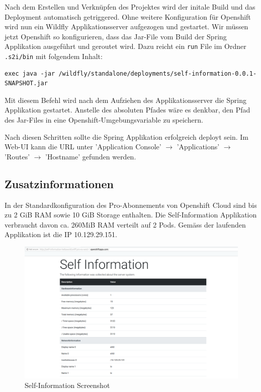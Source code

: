 \documentclass[12pt,a4paper]{article}
\begin{document}
Nach dem Erstellen und Verknüpfen des Projektes wird der initale Build und das Deployment automatisch getriggered. Ohne weitere Konfiguration für Openshift wird nun ein Wildfly Applikationsserver aufgezogen und gestartet. Wir müssen jetzt Openshift so konfigurieren, dass das Jar-File vom Build der Spring Applikation ausgeführt und geroutet wird. Dazu reicht ein \texttt{run} File im Ordner \texttt{.s2i/bin} mit folgendem Inhalt:
\begin{lstlisting}[breaklines=true]
exec java -jar /wildfly/standalone/deployments/self-information-0.0.1-SNAPSHOT.jar
\end{lstlisting}
Mit diesem Befehl wird nach dem Aufziehen des Applikationsserver die Spring Applikation gestartet. Anstelle des absoluten Pfades wäre es denkbar, den Pfad des Jar-Files in eine Openshift-Umgebungsvariable zu speichern. 

Nach diesen Schritten sollte die Spring Applikation erfolgreich deployt sein. Im Web-UI kann die URL unter 'Application Console' $\rightarrow$ 'Applications' $\rightarrow$ 'Routes' $\rightarrow$ 'Hostname' gefunden werden. 

\subsection{Zusatzinformationen}
In der Standardkonfiguration des Pro-Abonnements von Openshift Cloud sind bis zu 2 GiB RAM sowie 10 GiB Storage enthalten. Die Self-Information Applikation verbraucht davon ca. 260MiB RAM verteilt auf 2 Pods. Gemäss der laufenden Applikation ist die IP 10.129.29.151.

\begin{figure}[h]
	\centering
	\includegraphics[width=1\linewidth]{img/self-information}
	\caption{Self-Information Screenshot}
	\label{fig:self-information}
\end{figure}
\end{document}
